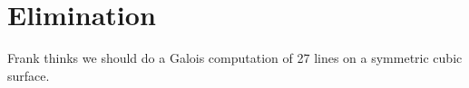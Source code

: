 


\section{Elimination}
%

{\color{red} Frank thinks we should do a Galois computation of 27 lines on a symmetric cubic surface.}

